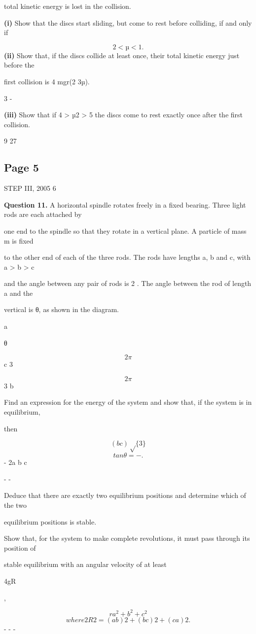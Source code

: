 \documentclass[12pt]{article}
\begin{document}
\begin{flushleft}
total kinetic energy is lost in the collision.\par
\textbf{(i)} Show that the discs start sliding, but come to rest before colliding, if and only if\par
\[2 < µ < 1.\]
\textbf{(ii)} Show that, if the discs collide at least once, their total kinetic energy just before the\par
first collision is 4 mgr(2 3µ).\par
3 -\par
\textbf{(iii)} Show that if 4 > µ2 > 5 the discs come to rest exactly once after the first collision.\par
9 27\par
\end{flushleft}
\subsection*{Page 5}
\begin{flushleft}
STEP III, 2005 6\par
\bigskip\textbf{Question 11.} A horizontal spindle rotates freely in a fixed bearing. Three light rods are each attached by\par
one end to the spindle so that they rotate in a vertical plane. A particle of mass m is fixed\par
to the other end of each of the three rods. The rods have lengths a, b and c, with a > b > c\par
and the angle between any pair of rods is 2 \pi. The angle between the rod of length a and the\par
vertical is θ, as shown in the diagram.\par
a\par
θ\par
\[2 \pi\]
c 3\par
\[2 \pi\]
3 b\par
Find an expression for the energy of the system and show that, if the system is in equilibrium,\par
then\par
\[(b c)\sqrt\{3\}\]
\[tan θ = - .\]
- 2a b c\par
- -\par
Deduce that there are exactly two equilibrium positions and determine which of the two\par
equilibrium positions is stable.\par
Show that, for the system to make complete revolutions, it must pass through its position of\par
stable equilibrium with an angular velocity of at least\par
4gR\par
,\par
\[r a^2 + b^2 + c^2\]
\[where 2R2 = (a b)2 + (b c)2 + (c a)2 .\]
- - -\par
\end{flushleft}
\end{document}
